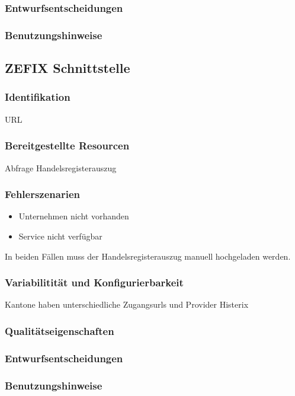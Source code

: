 \subsubsection{Entwurfsentscheidungen} 

\subsubsection{Benutzungshinweise} 

\subsection{ZEFIX Schnittstelle}

\subsubsection{Identifikation}
URL
\subsubsection{Bereitgestellte Resourcen}
Abfrage Handelsregisterauszug

\subsubsection{Fehlerszenarien}
\begin{itemize}
	\item Unternehmen nicht vorhanden
	\item Service nicht verfügbar
\end{itemize}
In beiden Fällen muss der Handelsregisterauszug manuell hochgeladen werden.

\subsubsection{Variabilitität und Konfigurierbarkeit}
Kantone haben unterschiedliche Zugangsurls und Provider
Histerix

\subsubsection{Qualitätseigenschaften}

\subsubsection{Entwurfsentscheidungen} 

\subsubsection{Benutzungshinweise} 

